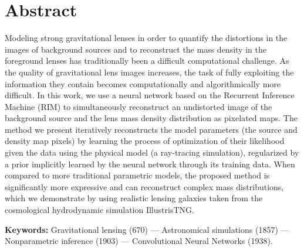 \section*{Abstract}
Modeling strong gravitational lenses in order to 
quantify the distortions in the images of background sources and 
to reconstruct the mass density in the foreground lenses has 
traditionally been a difficult computational challenge. 
As the quality of gravitational lens images increases, the task of fully exploiting the information they contain 
becomes computationally and algorithmically more difficult. 
In this work, we use a neural network based on the Recurrent Inference Machine (RIM) to simultaneously reconstruct 
an undistorted image of the background source and the lens mass density distribution as pixelated maps. 
The method we present iteratively reconstructs the model parameters (the source and density map pixels) by learning 
the process of optimization of their likelihood given the data using the physical model (a ray-tracing simulation), regularized
by a prior implicitly learned by the neural network through its training data. When compared to more traditional parametric models, 
the proposed method is significantly more expressive and can reconstruct complex mass distributions, 
which we demonstrate by using realistic lensing galaxies taken from the cosmological hydrodynamic simulation IllustrisTNG. 

\textbf{Keywords:} Gravitational lensing (670) ---
        Astronomical simulations (1857) ---
        Nonparametric inference (1903) ---
        Convolutional Neural Networks (1938).






